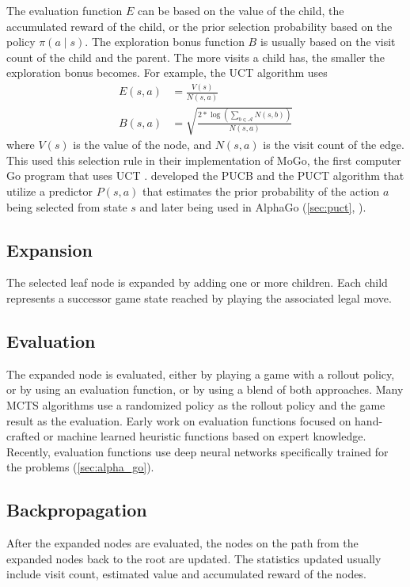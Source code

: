 The evaluation function $E$ can be based on the value of the child, the accumulated reward of the child, or the prior selection probability based on the policy $\pi(a \mid s)$.
The exploration bonus function $B$ is usually based on the visit count of the child and the parent.
The more visits a child has, the smaller the exploration bonus becomes.
For example, the UCT algorithm uses
\begin{align*}
    E(s, a)  & = \frac{V(s)}{N(s, a)}  \\
    B(s, a)  & = \sqrt{\frac{2 * \log(\sum_{b \in \mathcal{A}}N(s, b))}{N(s, a)}}
\end{align*}
where $V(s)$ is the value of the node, and $N(s, a)$ is the visit count of the edge.
This \citeauthor{ModificationUCTPatterns_Gelly.Wang.ea_2006} used this selection rule in their implementation of MoGo,
the first computer Go program that uses UCT \cite{ModificationUCTPatterns_Gelly.Wang.ea_2006}.
\citeauthor{MultiarmedBanditsEpisode_Rosin_2011} developed the PUCB and the PUCT algorithm that utilize a predictor $P(s, a)$ that estimates the prior probability of the action $a$ being selected from state $s$ and later being used in AlphaGo (\ref{sec:puct}, \cite{MultiarmedBanditsEpisode_Rosin_2011}).

\subsection{Expansion}
The selected leaf node is expanded by adding one or more children.
Each child represents a successor game state reached by playing the associated legal move.

\subsection{Evaluation}
The expanded node is evaluated, either by playing a game with a rollout policy, or by using an evaluation function, or by using a blend of both approaches.
Many MCTS algorithms use a randomized policy as the rollout policy and the game result as the evaluation.
Early work on evaluation functions focused on hand-crafted or machine learned heuristic functions based on expert knowledge.
Recently, evaluation functions use deep neural networks specifically trained for the problems (\ref{sec:alpha_go}).

\subsection{Backpropagation}
After the expanded nodes are evaluated, the nodes on the path from the expanded nodes back to the root are updated.
The statistics updated usually include visit count, estimated value and accumulated reward of the nodes.

